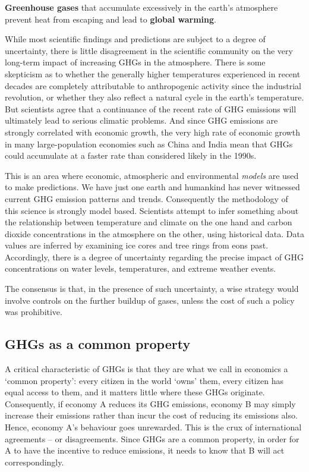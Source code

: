 \begin{DefBox}
\textbf{Greenhouse gases} that accumulate excessively in the earth's atmosphere prevent heat from escaping and lead to \textbf{global warming}.
\end{DefBox}

While most scientific findings and predictions are subject to a degree of uncertainty, there is little disagreement in the scientific community on the very long-term impact of increasing GHGs in the atmosphere. There is some skepticism as to whether the generally higher temperatures experienced in recent decades are completely attributable to anthropogenic activity since the industrial revolution, or whether they also  reflect a natural cycle in the earth's temperature. But scientists agree that a continuance of the recent rate of GHG emissions will ultimately lead to serious climatic problems. And since GHG emissions are strongly correlated with economic growth, the very high rate of economic growth in many large-population economies such as China and India mean that GHGs could accumulate at a faster rate than considered likely in the 1990s.

This is an area where economic, atmospheric and environmental \textit{models} are used to make predictions. We have just one earth and humankind has never witnessed current GHG emission patterns and trends. Consequently the methodology of this science is strongly model based. Scientists attempt to infer something about the relationship between temperature and climate on the one hand and carbon dioxide concentrations in the atmosphere on the other, using historical data. Data values are inferred by examining ice cores and tree rings from eons past. Accordingly, there is a degree of uncertainty regarding the precise impact of GHG concentrations on water levels, temperatures, and extreme weather events.

The consensus is that, in the presence of such uncertainty, a wise strategy would involve controls on the further buildup of gases, unless the cost of such a policy was prohibitive.

\subsection*{GHGs as a common property}

A critical characteristic of GHGs is that they are what we call in economics a `common property': every citizen in the world `owns' them, every citizen has equal access to them, and it matters little where these GHGs originate. Consequently, if economy A reduces its GHG emissions, economy B may simply increase their emissions rather than incur the cost of reducing its emissions also. Hence, economy A's behaviour goes unrewarded. This is the crux of international agreements -- or disagreements. Since GHGs are a common property, in order for A to have the incentive to reduce emissions, it needs to know that B will act correspondingly.

